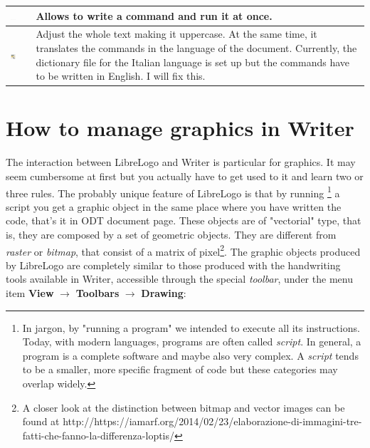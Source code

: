 \begin{center}
\begin{tabular}{ c | l | p{5cm} }
    \includegraphics[width=0.75cm]{./images/librelogo/220px-TextLO.png} &  & Allows to write a command and run it at once.
 \\ \hline
    \includegraphics[width=0.75cm]{./images/librelogo/MagicwLO.png} &  &  Adjust the whole text making it uppercase. At the same time, it translates the commands in the language of the document. Currently, the dictionary file for the Italian language is set up but the commands have to be written in English. I will fix this. \\ \hline
    \hline
  \end{tabular}
\end{center}

\section{How to manage graphics in Writer}

The interaction between LibreLogo and Writer is particular for graphics. It may seem cumbersome at first but you actually have to get used to it and learn two or three rules. The probably unique feature of LibreLogo is that by running \footnote{In jargon, by "running a program" we intended to execute all its instructions. Today, with modern languages, programs are often called \textit{script}. In general, a program is a complete software and maybe also very complex. A \textit{script} tends to be a smaller, more specific fragment of code but these categories may overlap widely.} a script you get a graphic object in the same place where you have written the code, that's it in ODT document page. These objects are of "vectorial" type, that is, they are composed by a set of geometric objects. They are different from \textit{raster} or \textit{bitmap}, that consist of a matrix of pixel\footnote{A closer look at the distinction between bitmap and vector images can be found at http://https://iamarf.org/2014/02/23/elaborazione-di-immagini-tre-fatti-che-fanno-la-differenza-loptis/}. The graphic objects produced by LibreLogo are completely similar to those produced with the handwriting tools available in Writer, accessible through the special \textit{toolbar}, under the menu item \textbf{View} $\rightarrow$ \textbf{Toolbars} $\rightarrow$ \textbf{Drawing}:

